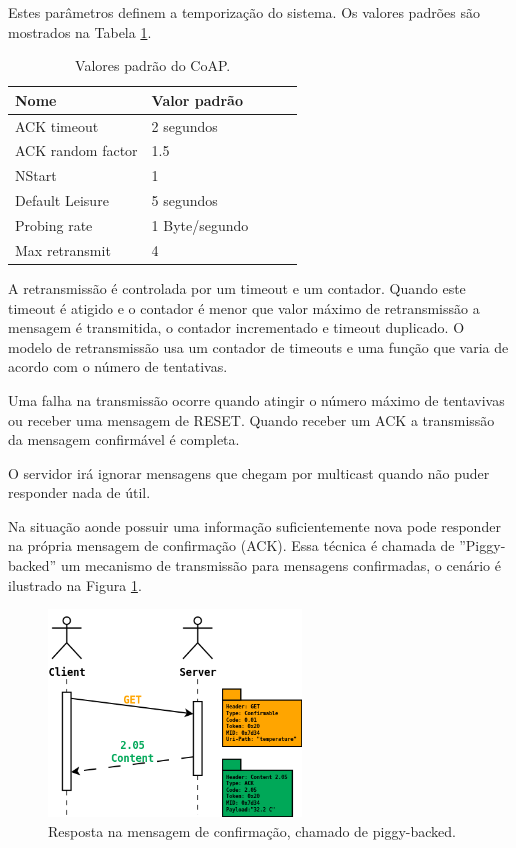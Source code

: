     Estes par\^ametros definem a temporiza\c{c}\~ao do sistema. Os valores padr\~oes s\~ao mostrados na Tabela \ref{coapDefault}.
\begin{table}[h]
\label{coapDefault}
\centering
\begin{tabular}{@{}lllll@{}}
\toprule
Nome & Valor padr\~ao & \\ \midrule
ACK timeout & 2 segundos & \\
ACK random factor & 1.5 & \\
NStart & 1 & \\
Default Leisure & 5 segundos & \\
Probing rate & 1 Byte/segundo & \\
Max retransmit & 4 &  \\ \midrule
\end{tabular}
\caption{Valores padr\~ao do CoAP.}
\end{table}

A retransmiss\~ao \'e controlada por um timeout e um contador. Quando este timeout \'e atigido e o contador \'e menor que valor m\'aximo de retransmiss\~ao a mensagem \'e transmitida, o contador incrementado e timeout duplicado. O modelo de retransmiss\~ao usa um contador de timeouts e uma fun\c{c}\~ao que varia de acordo com o n\'umero de tentativas.

Uma falha na transmiss\~ao ocorre quando atingir o n\'umero m\'aximo de tentavivas ou receber uma mensagem de RESET. Quando receber um ACK a transmiss\~ao da mensagem confirm\'avel \'e completa.

O servidor ir\'a ignorar mensagens que chegam por multicast quando n\~ao puder responder nada de \'util.

Na situa\c{c}\~ao aonde possuir uma informa\c{c}\~ao suficientemente nova pode responder na pr\'opria mensagem de confirma\c{c}\~ao (ACK). Essa t\'ecnica \'e chamada de ''Piggy-backed'' um mecanismo de transmiss\~ao para mensagens confirmadas, o cen\'ario \'e ilustrado na Figura \ref{piggyBacked}.\cite{draft-ietf-core-coap-18}
\begin{figure}[h]
   \label{piggyBacked}
   \centering
   \includegraphics[width=0.6\textwidth]{figuras/piggybacked.png}
   \caption{Resposta na mensagem de confirma\c{c}\~ao, chamado de piggy-backed.}
\end{figure}

